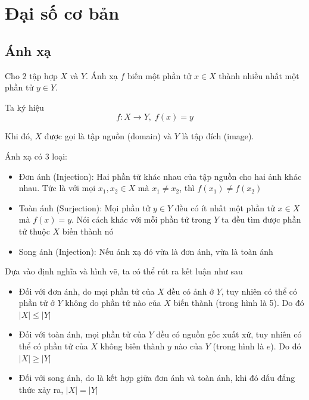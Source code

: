 \chapter{Đại số cơ bản}

\section{Ánh xạ}

Cho 2 tập hợp $X$ và $Y$. Ánh xạ $f$ biến một phần tử $x \in X$ thành nhiều nhất một phần tử $y \in Y$.

Ta ký hiệu
\[f: X \rightarrow Y, \; f(x) = y\]

Khi đó, $X$ được gọi là tập nguồn (domain) và $Y$ là tập đích (image).

Ánh xạ có 3 loại:

\begin{itemize}[noitemsep]
    \item Đơn ánh (Injection): Hai phần tử khác nhau của tập nguồn cho hai ảnh khác nhau. Tức là với mọi $x_1, x_2 \in X$ mà $x_1 \neq x_2$, thì $f(x_1) \neq f(x_2)$
    \item Toàn ánh (Surjection): Mọi phần tử $y \in Y$ đều có ít nhất một phần tử $x \in X$ mà $f(x) = y$. Nói cách khác với mỗi phần tử trong $Y$ ta đều tìm được phần tử thuộc $X$ biến thành nó
    \item Song ánh (Injection): Nếu ánh xạ đó vừa là đơn ánh, vừa là toàn ánh
\end{itemize}

\begin{remark}
    Dựa vào định nghĩa và hình vẽ, ta có thể rút ra kết luận như sau
    \begin{itemize}[noitemsep]
        \item Đối với đơn ánh, do mọi phần tử của $X$ đều có ảnh ở $Y$, tuy nhiên có thể có phần tử ở $Y$ không do phần tử nào của $X$ biến thành (trong hình là 5). Do đó $| X | \leq | Y |$
        \item Đối với toàn ánh, mọi phần tử của $Y$ đều có nguồn gốc xuất xứ, tuy nhiên có thể có phần tử của $X$ không biến thành $y$ nào của $Y$ (trong hình là $e$). Do đó $| X | \geq | Y |$
        \item Đối với song ánh, do là kết hợp giữa đơn ánh và toàn ánh, khi đó dấu đẳng thức xảy ra, $| X | = | Y |$
    \end{itemize}
\end{remark}

